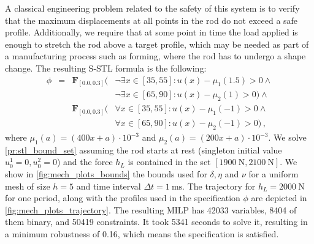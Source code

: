 \documentclass[letterpaper, 10 pt, conference]{ieeeconf/ieeeconf}
\newcommand{\Event}{\mathbf{F}}
\begin{document}

A classical engineering problem related to the safety of this system is to
verify that the maximum displacements at all points in the rod do not exceed a
safe profile. Additionally, we require that at some point in time the load
applied is enough to stretch the rod above a target profile, which may be needed
as part of a manufacturing process such as forming, where the rod has to undergo a shape change. 
The resulting S-STL formula is the following:
%
\begin{equation}
\begin{aligned}
    \phi &= & \Event_{[0.0, 0.3]} \big ( & \lnot \exists x \in [35, 55]: u(x) -
        \mu_1(1.5) > 0 \land \\
    & & &\lnot \exists x \in [65, 90]: u(x) - \mu_2(1) > 0 \big)
    \land \\
    & & \Event_{[0.0, 0.3]} \big ( & \forall x \in [35, 55]: u(x) - \mu_1(-1) > 0 \land \\
    & & & \forall x \in [65, 90]: u(x) - \mu_2(-1) > 0 \big ) \,,
    \end{aligned}
\end{equation}
%
where $\mu_1(a) = (400x + a) \cdot 10^{-3}$ and $\mu_2(a) = (200x + a) \cdot
10^{-3}$.
We solve \cref{pr:stl_bound_set} assuming the rod starts at rest (singleton
initial value $u_0^1 = 0,
u_0^2 = 0$) and the force $h_L$ is contained in the set $[\SI{1900}{\newton},
\SI{2100}{\newton}]$. We show in
\cref{fig:mech_plots_bounds} the bounds used for $\delta, \eta$ and $\nu$ for a
uniform mesh of size $h=5$ and time interval $\Delta t = \SI{1}{\milli\second}$. 
The trajectory for $h_L = \SI{2000}{\newton}$ for one period, 
along with the profiles used in the
specification $\phi$ are depicted in \cref{fig:mech_plots_trajectory}. 
The resulting MILP has 42033
variables, 8404 of them binary, and 50419 constraints. It took 5341 seconds to
solve it, resulting in a minimum robustness of 0.16, which means the
specification is satisfied.
\end{document}
